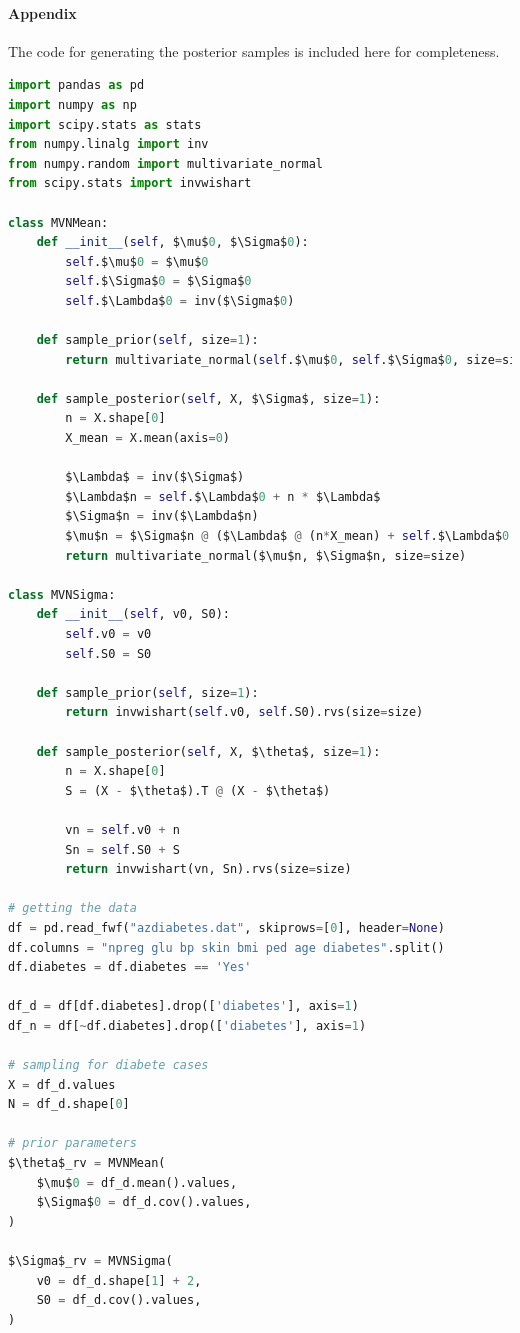 \documentclass[11pt, letterpaper]{article}
\begin{document}
\paragraph{Appendix}
The code for generating the posterior samples is included here for completeness.
\begin{lstlisting}[language=Python]
import pandas as pd
import numpy as np
import scipy.stats as stats
from numpy.linalg import inv
from numpy.random import multivariate_normal
from scipy.stats import invwishart

class MVNMean:
    def __init__(self, $\mu$0, $\Sigma$0):
        self.$\mu$0 = $\mu$0
        self.$\Sigma$0 = $\Sigma$0
        self.$\Lambda$0 = inv($\Sigma$0)
    
    def sample_prior(self, size=1):
        return multivariate_normal(self.$\mu$0, self.$\Sigma$0, size=size)
    
    def sample_posterior(self, X, $\Sigma$, size=1):
        n = X.shape[0]
        X_mean = X.mean(axis=0)

        $\Lambda$ = inv($\Sigma$)
        $\Lambda$n = self.$\Lambda$0 + n * $\Lambda$
        $\Sigma$n = inv($\Lambda$n)
        $\mu$n = $\Sigma$n @ ($\Lambda$ @ (n*X_mean) + self.$\Lambda$0 @ self.$\mu$0)
        return multivariate_normal($\mu$n, $\Sigma$n, size=size)

class MVNSigma:
    def __init__(self, v0, S0):
        self.v0 = v0
        self.S0 = S0
    
    def sample_prior(self, size=1):
        return invwishart(self.v0, self.S0).rvs(size=size)
    
    def sample_posterior(self, X, $\theta$, size=1):
        n = X.shape[0]
        S = (X - $\theta$).T @ (X - $\theta$)

        vn = self.v0 + n
        Sn = self.S0 + S
        return invwishart(vn, Sn).rvs(size=size)

# getting the data
df = pd.read_fwf("azdiabetes.dat", skiprows=[0], header=None)
df.columns = "npreg glu bp skin bmi ped age diabetes".split()
df.diabetes = df.diabetes == 'Yes'

df_d = df[df.diabetes].drop(['diabetes'], axis=1)
df_n = df[~df.diabetes].drop(['diabetes'], axis=1)

# sampling for diabete cases
X = df_d.values
N = df_d.shape[0]

# prior parameters
$\theta$_rv = MVNMean(
    $\mu$0 = df_d.mean().values,
    $\Sigma$0 = df_d.cov().values,
)

$\Sigma$_rv = MVNSigma(
    v0 = df_d.shape[1] + 2,
    S0 = df_d.cov().values,
)


\end{lstlisting}
\end{document}
